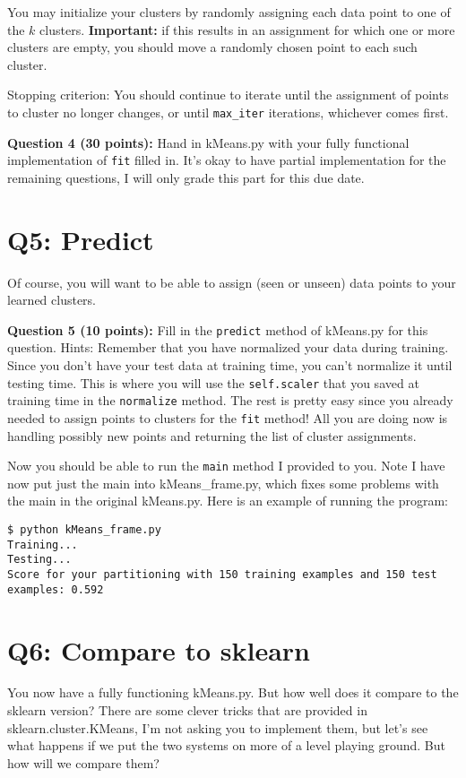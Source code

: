 \documentclass[11pt]{article}
\begin{document}
You may initialize your clusters by randomly assigning each data point to one of the $k$ clusters.
\textbf{Important:} if this results in an assignment for which one or more clusters are empty, you should move a randomly chosen point to each such cluster.

Stopping criterion: 
You should continue to iterate until the assignment of points to cluster no longer changes, or until \texttt{max_iter} iterations, whichever comes first.

\textbf{Question 4 (30 points):}
Hand in kMeans.py with your fully functional implementation of 
\texttt{fit} filled in. It's okay to have partial implementation for the remaining questions, I will only grade this part for this due date.

\section{Q5: Predict}

Of course, you will want to be able to assign (seen or unseen) data points to your
learned clusters. 

\textbf{Question 5 (10 points):} Fill in the \texttt{predict} method of kMeans.py for this question. 
Hints: Remember that you have normalized your data during training. Since 
you don't have your test data at training time, you can't normalize it until
testing time. This is where you will use the \texttt{self.scaler} that you saved at training time in the \texttt{normalize} method.
The rest is pretty easy since you already needed to assign points to clusters for the \texttt{fit} method! All you are doing now is handling possibly new points and returning the list of cluster assignments.

Now you should be able to run the \texttt{main} method I provided to you. Note I have now put just the main into kMeans_frame.py, which fixes some problems with the main in the original kMeans.py. 
Here is an example of running the program:
\begin{verbatim}
$ python kMeans_frame.py 
Training...
Testing...
Score for your partitioning with 150 training examples and 150 test examples: 0.592 
\end{verbatim}

\section{Q6: Compare to sklearn}

You now have a fully functioning kMeans.py. But how well does it compare to the sklearn version?
There are some clever tricks that are provided in sklearn.cluster.KMeans, I'm not 
asking you to implement them, but let's see what happens if we put the two
systems on more of a level playing ground. But how will we compare them?
\end{document}
